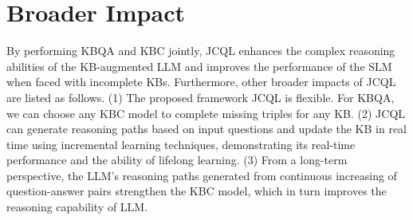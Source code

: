 \section{Broader Impact} \label{appendix:limitations}
By performing KBQA and KBC jointly, JCQL enhances the complex reasoning abilities of the KB-augmented LLM and improves the performance of the SLM when faced with incomplete KBs. Furthermore, other broader impacts of JCQL are listed as follows. (1) The proposed framework JCQL is flexible. For KBQA, we can choose any KBC model to complete missing triples for any KB. 
(2) JCQL can generate reasoning paths based on input questions and update the KB in real time using incremental learning techniques, demonstrating its real-time performance and the ability of lifelong learning.
(3) From a long-term perspective, the LLM's reasoning paths generated from continuous increasing of question-answer pairs strengthen the KBC model, which in turn improves the reasoning capability of LLM.
